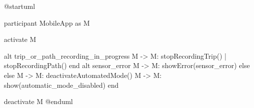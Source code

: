 @startuml

participant MobileApp as M

activate M

alt trip_or_path_recording_in_progress
M -> M: stopRecordingTrip() | stopRecordingPath()
end
alt sensor_error
M -> M: showError(sensor_error)
else else 
M -> M: deactivateAutomatedMode()
M -> M: show(automatic_mode_disabled)
end

deactivate M
@enduml